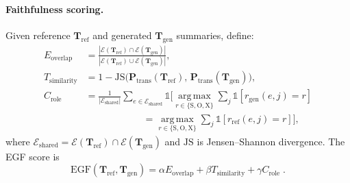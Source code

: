 \documentclass[11pt,a4paper]{article}
\begin{document}
\paragraph{Faithfulness scoring.} Given reference $\mathbf{T}_{\text{ref}}$ and generated $\mathbf{T}_{\text{gen}}$ summaries, define:
\begin{align}
E_{\text{overlap}} &= \frac{|\mathcal{E}(\mathbf{T}_{\text{ref}}) \cap \mathcal{E}(\mathbf{T}_{\text{gen}})|}{|\mathcal{E}(\mathbf{T}_{\text{ref}}) \cup \mathcal{E}(\mathbf{T}_{\text{gen}})|}, \\
T_{\text{similarity}} &= 1 - \mathrm{JS}\big(\mathbf{P}_{\text{trans}}(\mathbf{T}_{\text{ref}}),\, \mathbf{P}_{\text{trans}}(\mathbf{T}_{\text{gen}})\big), \\
C_{\text{role}} &= \frac{1}{|\mathcal{E}_{\text{shared}}|}\sum_{e\in\mathcal{E}_{\text{shared}}} \mathbb{1}\Big[\operatorname*{arg\,max}_{r\in\{\mathrm{S},\mathrm{O},\mathrm{X}\}} \sum_j \mathbb{1}[r_{\text{gen}}(e,j)=r] \\
&\qquad\qquad\qquad= \operatorname*{arg\,max}_{r\in\{\mathrm{S},\mathrm{O},\mathrm{X}\}} \sum_j \mathbb{1}[r_{\text{ref}}(e,j)=r] \Big],
\end{align}
where $\mathcal{E}_{\text{shared}} = \mathcal{E}(\mathbf{T}_{\text{ref}})\cap\mathcal{E}(\mathbf{T}_{\text{gen}})$ and $\mathrm{JS}$ is Jensen--Shannon divergence. The EGF score is
\begin{equation}
\mathrm{EGF}(\mathbf{T}_{\text{ref}},\mathbf{T}_{\text{gen}}) = \alpha E_{\text{overlap}} + \beta T_{\text{similarity}} + \gamma C_{\text{role}}\;.
\end{equation}
\end{document}
